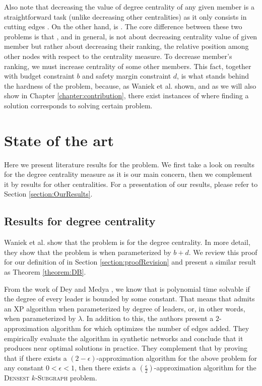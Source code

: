 Also note that decreasing the value of degree centrality of any given member is a straightforward task
(unlike decreasing other centralities) as it only consists in cutting edges \cite{Waniek2016}.
On the other hand, \HLdeg is \NPc \cite{Waniek2017}.
The core difference between these two problems is that \HLdeg, and \HLshort in general,
is not about decreasing centrality value of given member but rather about decreasing their ranking,
the relative position among other nodes with respect to the centrality measure.
To decrease member's ranking, we must increase centrality of some other members.
This fact, together with budget constraint $b$ and safety margin constraint $d$,
is what stands behind the hardness of the \HL problem, because,
as Waniek et al. \cite{Waniek2017} shown, and as we will also show in Chapter \ref{chapter:contribution},
there exist instances of \HLshort where finding a solution corresponds to solving certain \NPh problem.


\section{State of the art}

Here we present literature results for the \HL problem.
We first take a look on results for the degree centrality measure as it is our main concern, then we
complement it by results for other centralities.
For a presentation of our results, please refer to Section \ref{section:OurResults}.


\subsection{Results for degree centrality}\label{subsection:ResultsDegree}

Waniek et al. \cite{Waniek2017} show that the \HL problem is \NPc for the degree centrality.
In more detail, they show that the problem is \Wh when parameterized by $b+d$.
We review this proof for our definition of \HLshort in Section \ref{section:proofRevision} and present
a similar result as Theorem \ref{theorem:DB}.

From the work of Dey and Medya \cite{Dey2019}, we know that \HLdeg is polynomial time solvable
if the degree of every leader is bounded by some constant.
That means that \HLdeg admits an XP algorithm when parameterized by degree of leaders, or,
in other words, when parameterized by $\lambda$.
In addition to this, the authors present a $2$-approximation algorithm for \HLdeg which optimizes
the number of edges added.
They empirically evaluate the algorithm in synthetic networks and conclude that it produces near
optimal solutions in practice.
They complement that by proving that if there exists a $(2-\epsilon)$-approximation algorithm
for the above problem for any constant $0 < \epsilon < 1$, then there exists
a $(\frac{\epsilon}{2})$-approximation algorithm for the \textsc{Densest} $k$-\textsc{Subgraph} problem.



